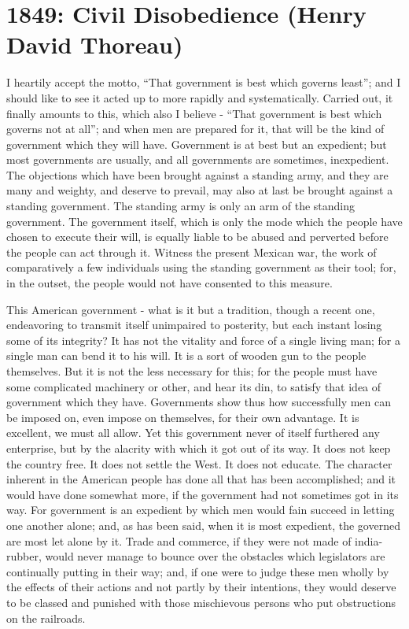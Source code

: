 \documentclass[letterpaper,12pt,english]{sphinxmanual}
\begin{document}
\chapter{1849: Civil Disobedience (Henry David Thoreau)}
\label{civil-disobedience::doc}\label{civil-disobedience:civil-disobedience-henry-david-thoreau}
I heartily accept the motto, ``That government is best which governs least''; and I should like to see it acted up to more rapidly and systematically. Carried out, it finally amounts to this, which also I believe - ``That government is best which governs not at all''; and when men are prepared for it, that will be the kind of government which they will have. Government is at best but an expedient; but most governments are usually, and all governments are sometimes, inexpedient. The objections which have been brought against a standing army, and they are many and weighty, and deserve to prevail, may also at last be brought against a standing government. The standing army is only an arm of the standing government. The government itself, which is only the mode which the people have chosen to execute their will, is equally liable to be abused and perverted before the people can act through it. Witness the present Mexican war, the work of comparatively a few individuals using the standing government as their tool; for, in the outset, the people would not have consented to this measure.

This American government - what is it but a tradition, though a recent one, endeavoring to transmit itself unimpaired to posterity, but each instant losing some of its integrity? It has not the vitality and force of a single living man; for a single man can bend it to his will. It is a sort of wooden gun to the people themselves. But it is not the less necessary for this; for the people must have some complicated machinery or other, and hear its din, to satisfy that idea of government which they have. Governments show thus how successfully men can be imposed on, even impose on themselves, for their own advantage. It is excellent, we must all allow. Yet this government never of itself furthered any enterprise, but by the alacrity with which it got out of its way. It does not keep the country free. It does not settle the West. It does not educate. The character inherent in the American people has done all that has been accomplished; and it would have done somewhat more, if the government had not sometimes got in its way. For government is an expedient by which men would fain succeed in letting one another alone; and, as has been said, when it is most expedient, the governed are most let alone by it. Trade and commerce, if they were not made of india-rubber, would never manage to bounce over the obstacles which legislators are continually putting in their way; and, if one were to judge these men wholly by the effects of their actions and not partly by their intentions, they would deserve to be classed and punished with those mischievous persons who put obstructions on the railroads.
\end{document}
